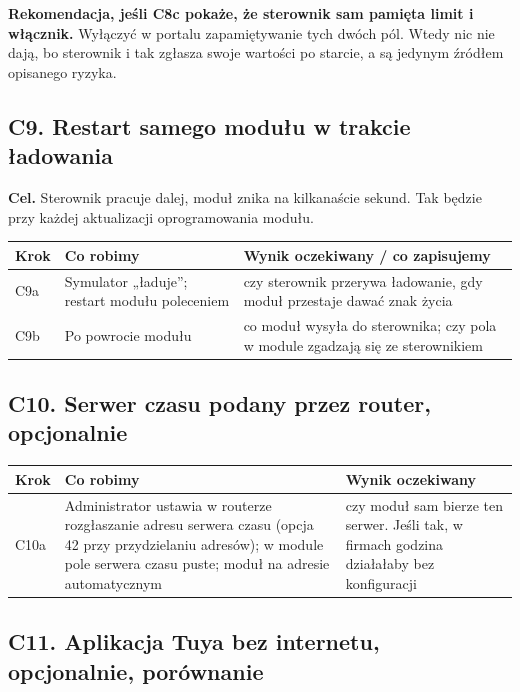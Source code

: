 \documentclass[11pt,a4paper]{article}
\begin{document}
\textbf{Rekomendacja, jeśli C8c pokaże, że sterownik sam pamięta limit i włącznik.} Wyłączyć w portalu zapamiętywanie tych dwóch pól. Wtedy nic nie dają, bo sterownik i tak zgłasza swoje wartości po starcie, a są jedynym źródłem opisanego ryzyka.


\subsection{C9. Restart samego modułu w trakcie ładowania}

\textbf{Cel.} Sterownik pracuje dalej, moduł znika na kilkanaście sekund. Tak będzie przy każdej aktualizacji oprogramowania modułu.


\begin{longtable}{>{\raggedright\arraybackslash}p{3.00cm}>{\raggedright\arraybackslash}p{3.52cm}>{\raggedright\arraybackslash}p{8.76cm}}
\toprule
\rowcolor{apteallight}\textbf{Krok} & \textbf{Co robimy} & \textbf{Wynik oczekiwany / co zapisujemy} \\
\midrule\endhead
\bottomrule\endfoot
C9a & Symulator „ładuje”; restart modułu poleceniem & czy sterownik przerywa ładowanie, gdy moduł przestaje dawać znak życia \\
C9b & Po powrocie modułu & co moduł wysyła do sterownika; czy pola w module zgadzają się ze sterownikiem \\
\end{longtable}

\subsection{C10. Serwer czasu podany przez router, opcjonalnie}

\begin{longtable}{>{\raggedright\arraybackslash}p{3.00cm}>{\raggedright\arraybackslash}p{6.55cm}>{\raggedright\arraybackslash}p{5.73cm}}
\toprule
\rowcolor{apteallight}\textbf{Krok} & \textbf{Co robimy} & \textbf{Wynik oczekiwany} \\
\midrule\endhead
\bottomrule\endfoot
C10a & Administrator ustawia w routerze rozgłaszanie adresu serwera czasu (opcja 42 przy przydzielaniu adresów); w module pole serwera czasu puste; moduł na adresie automatycznym & czy moduł sam bierze ten serwer. Jeśli tak, w firmach godzina działałaby bez konfiguracji \\
\end{longtable}

\subsection{C11. Aplikacja Tuya bez internetu, opcjonalnie, porównanie}
\end{document}
